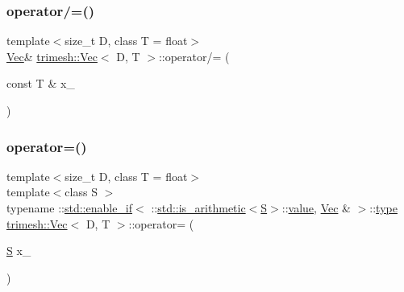 \subsubsection{\texorpdfstring{operator/=()}{operator/=()}\hspace{0.1cm}{\footnotesize\ttfamily [2/2]}}
{\footnotesize\ttfamily template$<$size\+\_\+t D, class T = float$>$ \\
\hyperlink{classtrimesh_1_1Vec}{Vec}\& \hyperlink{classtrimesh_1_1Vec}{trimesh\+::\+Vec}$<$ D, T $>$\+::operator/= (\begin{DoxyParamCaption}\item[{const T \&}]{x\+\_\+ }\end{DoxyParamCaption})\hspace{0.3cm}{\ttfamily [inline]}}

\mbox{\label{classtrimesh_1_1Vec_a9ac8f8e58310bcb2ad5e51203ce2603c}} 
\subsubsection{\texorpdfstring{operator=()}{operator=()}\hspace{0.1cm}{\footnotesize\ttfamily [1/2]}}
{\footnotesize\ttfamily template$<$size\+\_\+t D, class T = float$>$ \\
template$<$class S $>$ \\
typename \+::\hyperlink{structstd_1_1enable__if}{std\+::enable\+\_\+if}$<$ \+::\hyperlink{structstd_1_1is__arithmetic}{std\+::is\+\_\+arithmetic}$<$\hyperlink{ego_8cc_abde73cd36321648268fb4543509b996a}{S}$>$\+::\hyperlink{namespacetrimesh_ab10cc1052c9d1d1376d92211b6ca27dd}{value}, \hyperlink{classtrimesh_1_1Vec}{Vec} \& $>$\+::\hyperlink{namespacetrimesh_aa726c5bf9cff74a26269e8d258ae9e3d}{type} \hyperlink{classtrimesh_1_1Vec}{trimesh\+::\+Vec}$<$ D, T $>$\+::operator= (\begin{DoxyParamCaption}\item[{\hyperlink{ego_8cc_abde73cd36321648268fb4543509b996a}{S}}]{x\+\_\+ }\end{DoxyParamCaption})\hspace{0.3cm}{\ttfamily [inline]}}

\mbox{\label{classtrimesh_1_1Vec_a58662952592ba39f5415d2a6c5eea539}} 
